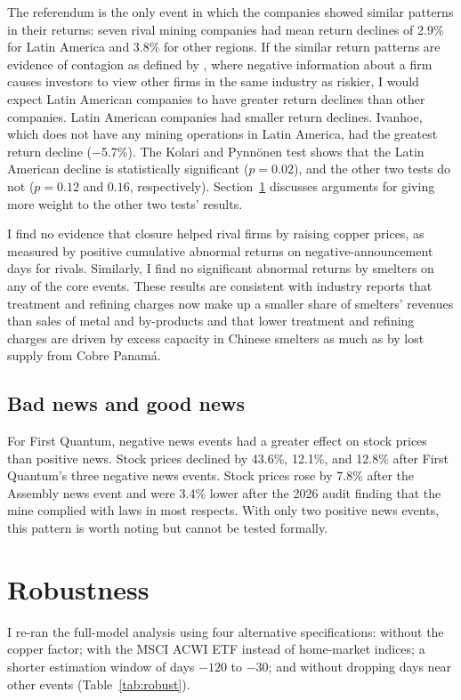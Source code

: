 \documentclass[11pt]{article}
\begin{document}
The referendum is the only event in which the companies showed similar patterns in their returns: seven rival mining companies had mean return declines of 2.9\% for Latin America and 3.8\% for other regions. If the similar return patterns are evidence of contagion as defined by \citet{lang1992}, where negative information about a firm causes investors to view other firms in the same industry as riskier, I would expect Latin American companies to have greater return declines than other companies. Latin American companies had smaller return declines. Ivanhoe, which does not have any mining operations in Latin America, had the greatest return decline ($-$5.7\%). The Kolari and Pynnönen test shows that the Latin American decline is statistically significant ($p = 0.02$), and the other two tests do not ($p = 0.12$ and $0.16$, respectively). Section~\ref{sec:robust} discusses arguments for giving more weight to the other two tests' results.

I find no evidence that closure helped rival firms by raising copper prices, as measured by positive cumulative abnormal returns on negative-announcement days for rivals. Similarly, I find no significant abnormal returns by smelters on any of the core events. These results are consistent with industry reports that treatment and refining charges now make up a smaller share of smelters' revenues than sales of metal and by-products \citep{cru2026} and that lower treatment and refining charges are driven by excess capacity in Chinese smelters as much as by lost supply from Cobre Panamá.

\subsection{Bad news and good news}

For First Quantum, negative news events had a greater effect on stock prices than positive news. Stock prices declined by 43.6\%, 12.1\%, and 12.8\% after First Quantum's three negative news events. Stock prices rose by 7.8\% after the Assembly news event and were 3.4\% lower after the 2026 audit finding that the mine complied with laws in most respects. With only two positive news events, this pattern is worth noting but cannot be tested formally.

\section{Robustness}
\label{sec:robust}

I re-ran the full-model analysis using four alternative specifications: without the copper factor; with the MSCI ACWI ETF instead of home-market indices; a shorter estimation window of days $-120$ to $-30$; and without dropping days near other events (Table~\ref{tab:robust}).
\end{document}
